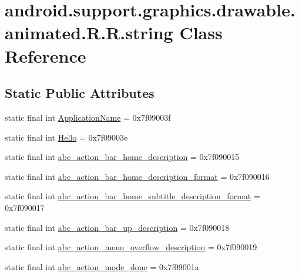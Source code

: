 \hypertarget{classandroid_1_1support_1_1graphics_1_1drawable_1_1animated_1_1_r_1_1string}{
\section{android.support.graphics.drawable.animated.R.R.string Class Reference}
\label{classandroid_1_1support_1_1graphics_1_1drawable_1_1animated_1_1_r_1_1string}
}
\subsection*{Static Public Attributes}
\begin{CompactItemize}
\item 
static final int \hyperlink{classandroid_1_1support_1_1graphics_1_1drawable_1_1animated_1_1_r_1_1string_8bea4f0a8d9378b7634866f85fba5413}{ApplicationName} = 0x7f09003f
\item 
static final int \hyperlink{classandroid_1_1support_1_1graphics_1_1drawable_1_1animated_1_1_r_1_1string_72bcbcd5455a4633fea95b434d33f70b}{Hello} = 0x7f09003e
\item 
static final int \hyperlink{classandroid_1_1support_1_1graphics_1_1drawable_1_1animated_1_1_r_1_1string_dfa4edc5d9b2a4e7cfd138ffe3f3b07c}{abc\_\-action\_\-bar\_\-home\_\-description} = 0x7f090015
\item 
static final int \hyperlink{classandroid_1_1support_1_1graphics_1_1drawable_1_1animated_1_1_r_1_1string_0d8922ffcb17224b042897342ab1fe7a}{abc\_\-action\_\-bar\_\-home\_\-description\_\-format} = 0x7f090016
\item 
static final int \hyperlink{classandroid_1_1support_1_1graphics_1_1drawable_1_1animated_1_1_r_1_1string_26f42e32ff60a249ae71c43a4f9778e2}{abc\_\-action\_\-bar\_\-home\_\-subtitle\_\-description\_\-format} = 0x7f090017
\item 
static final int \hyperlink{classandroid_1_1support_1_1graphics_1_1drawable_1_1animated_1_1_r_1_1string_a9048565711d8f5ca443094163e22652}{abc\_\-action\_\-bar\_\-up\_\-description} = 0x7f090018
\item 
static final int \hyperlink{classandroid_1_1support_1_1graphics_1_1drawable_1_1animated_1_1_r_1_1string_92ead50b55ac8480285438e6f31b5721}{abc\_\-action\_\-menu\_\-overflow\_\-description} = 0x7f090019
\item 
static final int \hyperlink{classandroid_1_1support_1_1graphics_1_1drawable_1_1animated_1_1_r_1_1string_eaf30b7abb6be1c5785e885861820f4f}{abc\_\-action\_\-mode\_\-done} = 0x7f09001a

\end{CompactItemize}
